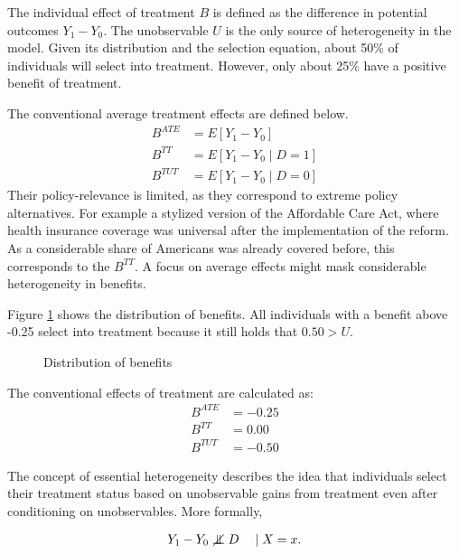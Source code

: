 \begin{boenumerate}
\item The individual effect of treatment $B$ is defined as the difference in potential outcomes $Y_1 - Y_0$. The unobservable $U$ is the only source of heterogeneity in the model. Given its distribution and the selection equation, about 50\% of individuals will select into treatment. However, only about 25\% have a positive benefit of treatment.

\item The conventional average treatment effects are defined below.
%
\begin{align*}
    B^{ATE} & = E[Y_1 - Y_0 ]\\
    B^{TT}  & = E[Y_1 - Y_0 \mid D = 1]\\
    B^{TUT} & = E[Y_1 - Y_0 \mid D = 0]
\end{align*}
%
Their policy-relevance is limited, as they correspond to extreme policy alternatives. For example a stylized version of the Affordable Care Act, where health insurance coverage was universal after the implementation of the reform. As a considerable share of Americans was already covered before, this corresponds to the $B^{TT}$. A focus on average effects might mask considerable heterogeneity in benefits.

Figure \ref{Distribution of benefits} shows the distribution of benefits. All individuals with a benefit above -0.25 select into treatment because it still holds that $0.50 > U$.

\begin{figure}[htp]\centering
\caption{Distribution of benefits}\label{Distribution of benefits}
\end{figure}

The conventional effects of treatment are calculated as:
%
\begin{align*}
    B^{ATE} & = -0.25 \\
    B^{TT}  & =  0.00\\
    B^{TUT} & = -0.50
\end{align*}

\item The concept of essential heterogeneity describes the idea that individuals select their treatment status based on unobservable gains from treatment even after conditioning on unobservables. More formally,

\begin{align*}
    Y_1 - Y_0 \notindep D\quad \mid X = x.
\end{align*}


\end{boenumerate}
